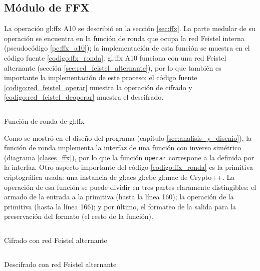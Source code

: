 %
%
%

\subsection{Módulo de FFX}

La operación \gls{gl:ffx} A10 se describió en la sección \ref{sec:ffx}. La
parte medular de su operación se encuentra en la función de ronda que ocupa
la red Feistel interna (pseudocódigo \ref{pc:ffx_a10}); la implementación de
esta función se muestra en el código fuente \ref{codigo:ffx_ronda}.
\gls{gl:ffx} A10 funciona con una red Feistel alternante (sección
\ref{sec:red_feistel_alternante}), por lo que también es importante la
implementación de este proceso; el código fuente
\ref{codigo:red_feistel_operar} muestra la operación de cifrado y
\ref{codigo:red_feistel_deoperar} muestra el descifrado.

\begin{listing}
  \inputminted[firstline=125, lastline=188]
    {c++}{../implementaciones/ffx/cabeceras/ronda_ffx_a10.hh}
  \caption{Función de ronda de \gls{gl:ffx}}
  \label{codigo:ffx_ronda}
\end{listing}

Como se mostró en el diseño del programa (capítulo
\ref{sec:analisis_y_disenio}), la función de ronda implementa la
interfaz de una función con inverso simétrico (diagrama \ref{clases_ffx}), por
lo que la función \texttt{operar} correspone a la definida por la interfaz.
Otro aspecto importante del código \ref{codigo:ffx_ronda} es la primitiva
criptográfica usada: una instancia de \gls{gl:aes} \gls{gl:cbc} \gls{gl:mac} de
Crypto++. La operación de esa función se puede dividir en tres partes
claramente distingibles: el armado de la entrada a la primitiva (hasta la línea
160); la operación de la primitiva (hasta la línea 166); y por último, el
formateo de la salida para la preservación del formato (el resto de la función).

\begin{listing}
  \inputminted[firstline=146, lastline=176]
    {c++}{../implementaciones/redes_feistel/cabeceras/red_feistel_alternante.hh}
  \caption{Cifrado con red Feistel alternante}
  \label{codigo:red_feistel_operar}
\end{listing}

\begin{listing}
  \inputminted[firstline=178, lastline=209]
    {c++}{../implementaciones/redes_feistel/cabeceras/red_feistel_alternante.hh}
  \caption{Descifrado con red Feistel alternante}
  \label{codigo:red_feistel_deoperar}
\end{listing}

